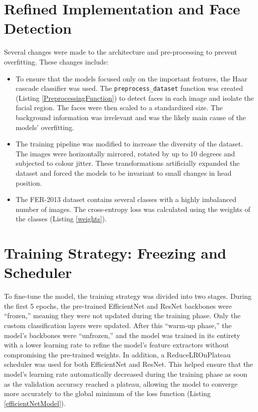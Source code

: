 \section{Refined Implementation and Face Detection}

Several changes were made to the architecture and pre-processing to prevent overfitting. These changes include:

\begin{itemize}
	\item To ensure that the models focused only on the important features, the Haar cascade classifier was used. The \verb|preprocess_dataset| function was created (Listing \ref{PreprocessingFunction}) to detect faces in each image and isolate the facial region. The faces were then scaled to a standardized size. The background information was irrelevant and was the likely main cause of the models’ overfitting.
	\item The training pipeline was modified to increase the diversity of the dataset. The images were horizontally mirrored, rotated by up to 10 degrees and subjected to colour jitter. These transformations artificially expanded the dataset and forced the models to be invariant to small changes in head position.
	\item The FER-2013 dataset contains several classes with a highly imbalanced number of images. The cross-entropy loss was calculated using the weights of the classes (Listing \ref{weights}).
\end{itemize}

\section{Training Strategy: Freezing and Scheduler}

To fine-tune the model, the training strategy was divided into two stages. During the first 5 epochs, the pre-trained EfficientNet and ResNet backbones were “frozen,” meaning they were not updated during the training phase. Only the custom classification layers were updated. After this “warm-up phase,” the model’s backbones were “unfrozen,” and the model was trained in its entirety with a lower learning rate to refine the model’s feature extractors without compromising the pre-trained weights.
In addition, a ReduceLROnPlateau scheduler was used for both EfficientNet and ResNet. This helped ensure that the model’s learning rate automatically decreased during the training phase as soon as the validation accuracy reached a plateau, allowing the model to converge more accurately to the global minimum of the loss function (Listing \ref{efficientNetModel}).
\newline

